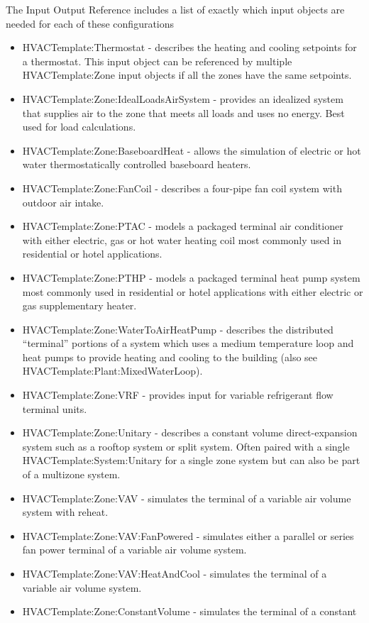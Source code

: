 The Input Output Reference includes a list of exactly which input
objects are needed for each of these configurations 
\begin{itemize}
\item HVACTemplate:Thermostat - describes the heating and cooling setpoints
for a thermostat. This input object can be referenced by multiple
HVACTemplate:Zone input objects if all the zones have the same setpoints.
\item HVACTemplate:Zone:IdealLoadsAirSystem - provides an idealized system
that supplies air to the zone that meets all loads and uses no energy.
Best used for load calculations.
\item HVACTemplate:Zone:BaseboardHeat - allows the simulation of electric
or hot water thermostatically controlled baseboard heaters.
\item HVACTemplate:Zone:FanCoil - describes a four-pipe fan coil system
with outdoor air intake.
\item HVACTemplate:Zone:PTAC - models a packaged terminal air conditioner
with either electric, gas or hot water heating coil most commonly
used in residential or hotel applications.
\item HVACTemplate:Zone:PTHP - models a packaged terminal heat pump system
most commonly used in residential or hotel applications with either
electric or gas supplementary heater.
\item HVACTemplate:Zone:WaterToAirHeatPump - describes the distributed ``terminal''
portions of a system which uses a medium temperature loop and heat
pumps to provide heating and cooling to the building (also see HVACTemplate:Plant:MixedWaterLoop).
\item HVACTemplate:Zone:VRF - provides input for variable refrigerant flow
terminal units.
\item HVACTemplate:Zone:Unitary - describes a constant volume direct-expansion
system such as a rooftop system or split system. Often paired with
a single HVACTemplate:System:Unitary for a single zone system but
can also be part of a multizone system.
\item HVACTemplate:Zone:VAV - simulates the terminal of a variable air volume
system with reheat.
\item HVACTemplate:Zone:VAV:FanPowered - simulates either a parallel or
series fan power terminal of a variable air volume system.
\item HVACTemplate:Zone:VAV:HeatAndCool - simulates the terminal of a variable
air volume system.
\item HVACTemplate:Zone:ConstantVolume - simulates the terminal of a constant

\end{itemize}
